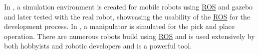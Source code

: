 In \cite{takaya2016simulation}, a simulation environment is created for mobile
robots using \hyperref[acro:ROS]{ROS} and gazebo and later tested with the real robot, showcasing the usability of the \hyperref[acro:ROS]{ROS} for the development process.
In \cite{qian2014manipulation}, a manipulator is simulated for the pick and place operation.
There are numerous robots build using \hyperref[acro:ROS]{ROS} and is used extensively by both hobbyists and robotic developers and is a powerful tool.